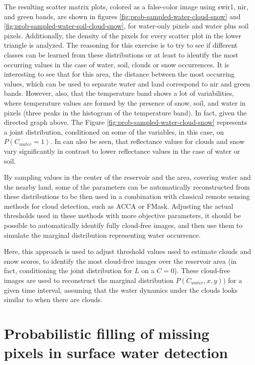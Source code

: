 The resulting scatter matrix plots, colored as a false-color image using swir1, nir, and green bands, are shown in figures \ref{fig:prob-sampled-water-cloud-snow} and \ref{fig:prob-sampled-water-soil-cloud-snow}, for water-only pixels and water plus soil pixels. Additionally, the density of the pixels for every scatter plot in the lower triangle is analyzed. The reasoning for this exercise is to try to see if different classes can be learned from these distributions or at least to identify the most occurring values in the case of water, soil, clouds or snow occurrences. It is interesting to see that for this area, the distance between the most occurring values, which can be used to separate water and land correspond to nir and green bands. However, also, that the temperature band shows a lot of variabilities, where temperature values are formed by the presence of snow, soil, and water in pixels (three peaks in the histogram of the temperature band). In fact, given the directed graph above. The Figure \ref{fig:prob-sampled-water-cloud-snow} represents a joint distribution, conditioned on some of the variables, in this case, on $P(C_{water}=1)$. In can also be seen, that reflectance values for clouds and snow vary significantly in contrast to lower reflectance values in the case of water or soil. 

By sampling values in the center of the reservoir and the area, covering water and the nearby land, some of the parameters can be automatically reconstructed from these distributions to be then used in a combination with classical remote sensing methods for cloud detection, such as ACCA or FMask. Adjusting the actual thresholds used in these methods with more objective parameters, it should be possible to automatically identify fully cloud-free images, and then use them to simulate the marginal distribution representing water occurrence. 

Here, this approach is used to adjust threshold values used to estimate clouds and snow scores, to identify the most cloud-free images over the reservoir area (in fact, conditioning the joint distribution for $L$ on a $C=0$). These cloud-free images are used to reconstruct the marginal distribution $P(C_{water}, x, y))$ for a given time interval, assuming that the water dynamics under the clouds looks similar to when there are clouds.

\section{Probabilistic filling of missing pixels in surface water detection}

